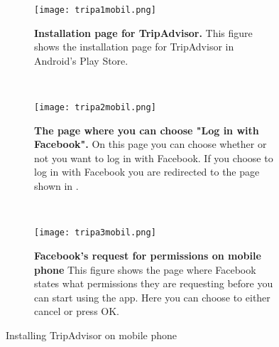 \begin{figure}
        \centering
        \begin{subfigure}[b]{0.3\textwidth}
                \texttt{[image: tripa1mobil.png]}
                \caption[Installation page for TripAdvisor]{\textbf{Installation 				page for TripAdvisor.} This figure shows the installation page 						for TripAdvisor in Android's Play Store.} 
                \label{fig:tripa1mobil}
        \end{subfigure}%
        ~ %
        \begin{subfigure}[b]{0.3\textwidth}
                \texttt{[image: tripa2mobil.png]}
               \caption[The page where you choose "Log in with Facebook"]							{\textbf{The page where you can choose "Log in with Facebook".} 					On this page you can choose whether or not you want to log in 						with Facebook. If you choose to log in with Facebook you are 						redirected to the page shown in .} 
                \label{fig:tripa2mobil}
        \end{subfigure}
        ~ %
        \begin{subfigure}[b]{0.3\textwidth}
                \texttt{[image: tripa3mobil.png]}
                \caption[Facebook's request for permissions on mobile phone]						{\textbf{Facebook's request for permissions on mobile phone} 						This figure shows the page where Facebook states what 								permissions they are requesting before you can start using the 						app. Here you can choose to either cancel or press OK.} 
                \label{fig:tripa3mobil}
        \end{subfigure}
        \caption{Installing TripAdvisor on mobile phone}\label{fig:mobileinstallation}
\end{figure}


